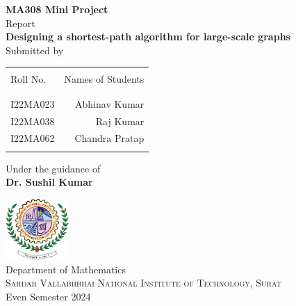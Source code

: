 \begin{titlepage}

\begin{center}

\textup{\small {\bf MA308 Mini Project} \\ Report}\\[0.2in]

\Large \textbf {Designing a shortest-path algorithm for large-scale graphs}\\[0.5in]

\normalsize Submitted by \\
\begin{table}[h]
\centering
\begin{tabular}{lr}\hline \\
Roll No. & Names of Students \\ \\ \hline
\\
I22MA023 & Abhinav Kumar \\ 
I22MA038 &  Raj Kumar \\
I22MA062 & Chandra Pratap \\ \\ \hline 
\end{tabular}
\end{table}

\vspace{.1in}
Under the guidance of\\
{\textbf{Dr. Sushil Kumar}}\\[0.2in]

\vfill

\includegraphics[width=0.18\textwidth]{./svnit-logo}\\[0.1in]
\Large{Department of Mathematics}\\
\normalsize
\textsc{Sardar Vallabhbhai National Institute of Technology, Surat}\\
\vspace{0.2cm}
Even Semester 2024

\end{center}

\end{titlepage}
